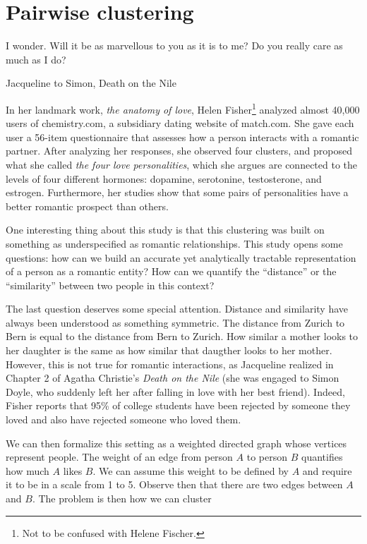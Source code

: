 \chapter{Pairwise clustering}

\epigraph{I wonder. Will it be as marvellous to you as it is to me? Do you really care as much as I do?}{Jacqueline to Simon, Death on the Nile}

In her landmark work, \emph{the anatomy of love}, Helen Fisher\footnote{Not to be confused with Helene Fischer.} analyzed almost 40,000 users of chemistry.com, a subsidiary dating website of match.com. She gave each user a 56-item questionnaire that assesses how a person interacts with a romantic partner. After analyzing her responses, she observed four clusters, and proposed what she called \emph{the four love personalities}, which she argues are connected to the levels of four different hormones: dopamine, serotonine, testosterone, and estrogen. Furthermore, her studies show that some pairs of personalities have a better romantic prospect than others.

One interesting thing about this study is that this clustering was built on something as underspecified as romantic relationships. This study opens some questions: how can we build an accurate yet analytically tractable representation of a person as a romantic entity? How can we quantify the ``distance'' or the ``similarity'' between two people in this context?

The last question deserves some special attention. Distance and similarity have always been understood as something symmetric. The distance from Zurich to Bern is equal to the distance from Bern to Zurich. How similar a mother looks to her daughter is the same as how similar that daugther looks to her mother. However, this is not true for romantic interactions, as Jacqueline realized in Chapter 2 of Agatha Christie's \textit{Death on the Nile} (she was engaged to Simon Doyle, who suddenly left her after falling in love with her best friend). Indeed, Fisher reports that 95\% of college students have been rejected by someone they loved and also have rejected someone who loved them.

We can then formalize this setting as a weighted directed graph whose vertices represent people. The weight of an edge from person $A$ to person $B$ quantifies how much $A$ likes $B$. We can assume this weight to be defined by $A$ and require it to be in a scale from 1 to 5. Observe then that there are two edges between $A$ and $B$. The problem is then how we can cluster

